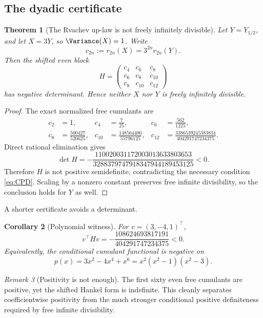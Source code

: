\documentclass[11pt,oneside]{article}
\newtheorem{theorem}{Theorem}[section]
\newtheorem{corollary}[theorem]{Corollary}
\theoremstyle{definition}
\theoremstyle{remark}
\newtheorem{remark}[theorem]{Remark}
\begin{document}
\subsection{The dyadic certificate}
\begin{theorem}[The Rvachev up-law is not freely infinitely divisible]\label{thm:upnotFID}
Let \(Y=Y_{1/2}\), and let \(X=3Y\), so \(\Variance(X)=1\). Write
\[
c_{2n}:=r_{2n}(X)=3^{2n}r_{2n}(Y).
\]
Then the shifted even block
\begin{equation}\label{eq:Hmatrix}
H=\begin{pmatrix}
c_4&c_6&c_8\\
c_6&c_8&c_{10}\\
c_8&c_{10}&c_{12}
\end{pmatrix}
\end{equation}
has negative determinant. Hence neither \(X\) nor \(Y\) is freely infinitely divisible.
\end{theorem}

\begin{proof}
The exact normalized free cumulants are
\begin{align*}
c_2&=1,& c_4&=\frac7{25},& c_6&=\frac{562}{1225},\\
c_8&=\frac{500427}{520625},&
c_{10}&=\frac{148564406}{55796125},&
c_{12}&=\frac{3386539245383834}{404291747234375}.
\end{align*}
Direct rational elimination gives
\begin{equation}\label{eq:negativeDet}
\det H=-\frac{110020031172003013633803653}
{3288379747918347944189453125}<0.
\end{equation}
Therefore \(H\) is not positive semidefinite, contradicting the necessary condition \eqref{eq:CPD}. Scaling by a nonzero constant preserves free infinite divisibility, so the conclusion holds for \(Y\) as well.
\end{proof}

A shorter certificate avoids a determinant.
\begin{corollary}[Polynomial witness]\label{cor:polywitness}
For \(v=(3,-4,1)^\top\),
\begin{equation}\label{eq:negativeQ}
v^\top Hv=-\frac{108624693817191}{404291747234375}<0.
\end{equation}
Equivalently, the conditional cumulant functional is negative on
\[
p(x)=3x^2-4x^4+x^6=x^2(x^2-1)(x^2-3).
\]
\end{corollary}

\begin{remark}[Positivity is not enough]
The first sixty even free cumulants are positive, yet the shifted Hankel form is indefinite. This cleanly separates coefficientwise positivity from the much stronger conditional positive definiteness required by free infinite divisibility.
\end{remark}
\end{document}
